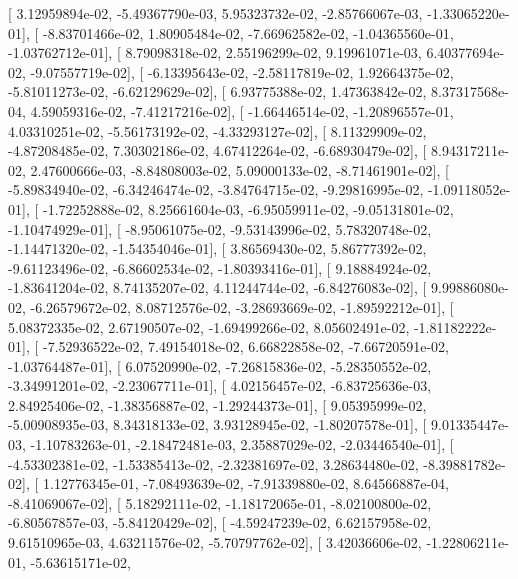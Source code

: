 \documentclass{article}
\begin{document}
       [  3.12959894e-02,  -5.49367790e-03,   5.95323732e-02,
         -2.85766067e-03,  -1.33065220e-01],
       [ -8.83701466e-02,   1.80905484e-02,  -7.66962582e-02,
         -1.04365560e-01,  -1.03762712e-01],
       [  8.79098318e-02,   2.55196299e-02,   9.19961071e-03,
          6.40377694e-02,  -9.07557719e-02],
       [ -6.13395643e-02,  -2.58117819e-02,   1.92664375e-02,
         -5.81011273e-02,  -6.62129629e-02],
       [  6.93775388e-02,   1.47363842e-02,   8.37317568e-04,
          4.59059316e-02,  -7.41217216e-02],
       [ -1.66446514e-02,  -1.20896557e-01,   4.03310251e-02,
         -5.56173192e-02,  -4.33293127e-02],
       [  8.11329909e-02,  -4.87208485e-02,   7.30302186e-02,
          4.67412264e-02,  -6.68930479e-02],
       [  8.94317211e-02,   2.47600666e-03,  -8.84808003e-02,
          5.09000133e-02,  -8.71461901e-02],
       [ -5.89834940e-02,  -6.34246474e-02,  -3.84764715e-02,
         -9.29816995e-02,  -1.09118052e-01],
       [ -1.72252888e-02,   8.25661604e-03,  -6.95059911e-02,
         -9.05131801e-02,  -1.10474929e-01],
       [ -8.95061075e-02,  -9.53143996e-02,   5.78320748e-02,
         -1.14471320e-02,  -1.54354046e-01],
       [  3.86569430e-02,   5.86777392e-02,  -9.61123496e-02,
         -6.86602534e-02,  -1.80393416e-01],
       [  9.18884924e-02,  -1.83641204e-02,   8.74135207e-02,
          4.11244744e-02,  -6.84276083e-02],
       [  9.99886080e-02,  -6.26579672e-02,   8.08712576e-02,
         -3.28693669e-02,  -1.89592212e-01],
       [  5.08372335e-02,   2.67190507e-02,  -1.69499266e-02,
          8.05602491e-02,  -1.81182222e-01],
       [ -7.52936522e-02,   7.49154018e-02,   6.66822858e-02,
         -7.66720591e-02,  -1.03764487e-01],
       [  6.07520990e-02,  -7.26815836e-02,  -5.28350552e-02,
         -3.34991201e-02,  -2.23067711e-01],
       [  4.02156457e-02,  -6.83725636e-03,   2.84925406e-02,
         -1.38356887e-02,  -1.29244373e-01],
       [  9.05395999e-02,  -5.00908935e-03,   8.34318133e-02,
          3.93128945e-02,  -1.80207578e-01],
       [  9.01335447e-03,  -1.10783263e-01,  -2.18472481e-03,
          2.35887029e-02,  -2.03446540e-01],
       [ -4.53302381e-02,  -1.53385413e-02,  -2.32381697e-02,
          3.28634480e-02,  -8.39881782e-02],
       [  1.12776345e-01,  -7.08493639e-02,  -7.91339880e-02,
          8.64566887e-04,  -8.41069067e-02],
       [  5.18292111e-02,  -1.18172065e-01,  -8.02100800e-02,
         -6.80567857e-03,  -5.84120429e-02],
       [ -4.59247239e-02,   6.62157958e-02,   9.61510965e-03,
          4.63211576e-02,  -5.70797762e-02],
       [  3.42036606e-02,  -1.22806211e-01,  -5.63615171e-02,
\end{document}
